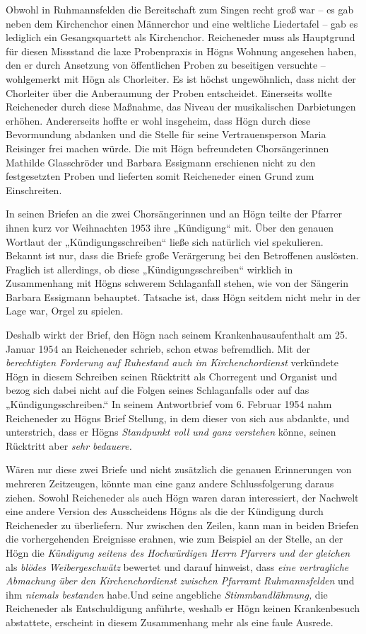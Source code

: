 \documentclass{book}
\newcommand{\zitat}[1]{\textit{#1}}
\begin{document}
Obwohl in Ruhmannsfelden die Bereitschaft zum Singen recht groß war – es
gab neben dem Kirchenchor einen Männerchor und eine weltliche
Lieder\-tafel – gab es lediglich ein Gesangsquartett als Kirchenchor.
Reicheneder muss als Hauptgrund für diesen Missstand die laxe
Probenpraxis in Högns Woh\-nung angesehen haben, den er durch Ansetzung
von öffentlichen Proben zu beseitigen versuchte – wohlgemerkt mit Högn
als Chorleiter. Es ist höchst ungewöhnlich, dass nicht der Chorleiter
über die Anberaumung der Proben entscheidet. Einerseits wollte
Reicheneder durch diese Maßnahme, das Niveau der musikalischen
Darbietungen erhöhen. Andererseits hoffte er wohl insge\-heim, dass
Högn durch diese Bevormundung abdanken und die Stelle für seine
Vertrauensperson Maria Reisinger frei machen würde. Die mit Högn
befreundeten Chorsängerinnen Mathilde Glasschröder und Barbara
Essig\-mann erschienen nicht zu den festgesetzten Proben und lieferten
somit Reicheneder einen Grund zum Einschreiten. 

In seinen Briefen an die zwei Chorsängerinnen und an Högn teilte der
Pfarrer ihnen kurz vor Weihnachten 1953 ihre „Kündigung“ mit. Über den
genauen Wortlaut der „Kündigungsschreiben“ ließe sich natürlich viel
spekulieren. Bekannt ist nur, dass die Briefe große Verärgerung bei den
Betroffenen auslösten. Fraglich ist allerdings, ob diese
„Kündigungsschreiben“ wirklich in Zusammenhang mit Högns schwerem
Schlaganfall stehen, wie von der Sängerin Barbara Essigmann behauptet.
Tatsache ist, dass Högn seitdem nicht mehr in der Lage war, Orgel zu
spielen.

Deshalb wirkt der Brief, den Högn nach seinem Krankenhausaufenthalt am
25. Januar 1954 an Reicheneder schrieb, schon etwas befremdlich. Mit
der \zitat{berechtigten Forderung auf Ruhestand auch im
Kirchenchordienst} verkündete Högn in diesem Schreiben seinen Rücktritt
als Chorregent und Organist und bezog sich dabei nicht auf die Folgen
seines Schlaganfalls oder auf das „Kündigungs\-schreiben.“ In seinem
Antwortbrief vom 6. Februar 1954 nahm Reicheneder zu Högns Brief
Stellung, in dem dieser von sich aus abdankte, und unterstrich, dass er
Högns \zitat{Standpunkt voll und ganz verstehen} könne,
seinen Rücktritt aber \zitat{sehr bedauere.}

Wären nur diese zwei Briefe und nicht zusätzlich die genauen
Erinnerun\-gen von mehreren Zeitzeugen, könnte man eine ganz andere
Schlussfolgerung daraus ziehen. Sowohl Reicheneder als auch Högn waren
daran interessiert, der Nachwelt eine andere Version des Ausscheidens
Högns als die der Kün\-digung durch Reicheneder zu überliefern. Nur
zwischen den Zeilen, kann man in beiden Briefen die vorhergehenden
Ereignisse erahnen, wie zum Beispiel an der Stelle, an der Högn die
\zitat{Kündigung seitens des Hochwürdigen Herrn Pfarrers und
der gleichen} als \zitat{blödes Weibergeschwätz} bewertet und
darauf hinweist, dass \zitat{eine vertrag\-liche Abmachung
über den Kirchenchordienst zwischen Pfarramt Ruhmannsfelden} und ihm
 \textit{niemals bestanden} habe.\zitat{\textup{}}Und seine
angebliche \zitat{Stimmbandlähmung,} die Rei\-cheneder als
Entschuldigung anführte, weshalb er Högn keinen Kranken\-besuch
abstattete, erscheint in diesem Zusammenhang mehr als eine faule
Ausrede.
\end{document}
